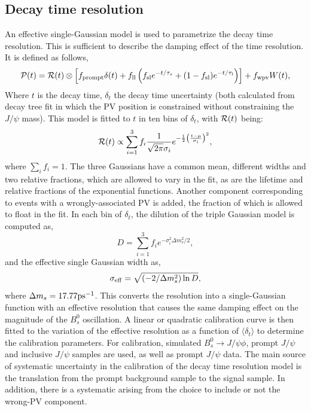 \subsection{Decay time resolution}
An effective single-Gaussian model is used to parametrize the decay time resolution. This is sufficient to describe the damping effect of the time resolution. It is defined as follows, %
\begin{equation}
    \mathcal{P}(t) = \mathcal{R}(t) \otimes
    \left[ f_{\mathrm{prompt}}\delta(t) + 
    f_{\mathrm{ll}} \left(f_{\mathrm{sl}}e^{- t / \tau_s} + (1 - f_{\rm sl})e^{- t / \tau_{\rm l}}\right)
    \right] + f_{\mathrm{wpv}} W(t),
    \label{eq:decay_time_pdf}
\end{equation}
Where $t$ is the decay time, $\delta_t$ the decay time uncertainty (both calculated from  decay tree fit in which the PV position is constrained without constraining the $J/\psi$ mass). This model is fitted to $t$ in ten bins of $\delta_t$, with ${\cal R}(t)$ being:
        \begin{equation}
            {\cal R}(t) \propto \sum_{i=1}^{3} f_i \frac{1}{\sqrt{2\pi}\sigma_i} e ^{-\frac{1}{2}\left(\frac{t-\mu}{\sigma_i}\right)^2},
        \label{eq:decay_time_res_model}
        \end{equation}
where $\sum_i f_i =1$.
The three Gaussians have a common mean, different widths and two relative fractions, which are allowed to vary in the fit, as are the lifetime and relative fractions of the exponential functions. Another component corresponding to events with a wrongly-associated PV is added, the fraction of which is allowed to float in the fit. In each bin of $\delta_t$, the dilution of the triple Gaussian model is computed as,
\begin{equation}
    \label{eqn:time_dilution_tr}
    D = \sum_{i=1}^{3}f_i e^{-\sigma_i^2\Delta m_s^2/2},
\end{equation}
and the effective single Gaussian width as,
\begin{equation}
    \label{eqn:time_eff_res_tr}
    \sigma_{\rm eff} = \sqrt{(-2/\Delta m_s^2)\ln D},
\end{equation}
where $\Delta m_s = 17.77 \rm ps^{-1}$. This converts the resolution into a single-Gaussian function with an effective resolution that causes the same damping effect on the magnitude of the $B_s^0$ oscillation. A linear or quadratic calibration curve is then fitted to the variation of the effective resolution as a function of $\langle\delta_t\rangle$ to determine the calibration parameters. 
For calibration, simulated $B_s^0 \rightarrow J/\psi \phi$, prompt $J/\psi$ and inclusive $J/\psi$ samples are used, as well as prompt $J/\psi$ data.
The main source of systematic uncertainty in the calibration of the decay time resolution model is the translation from the prompt background sample to the signal sample. In addition, there is a systematic arising from the choice to include or not the
wrong-PV component.

